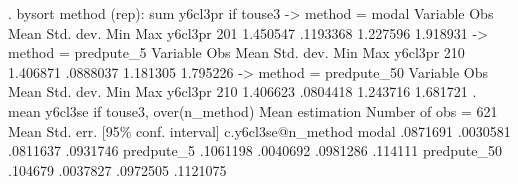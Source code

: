 . bysort method (rep): sum y6cl3pr if touse3
{\smallskip}
-> method = modal
{\smallskip}
    Variable {\VBAR}        Obs        Mean    Std. dev.       Min        Max
     y6cl3pr {\VBAR}        201    1.450547    .1193368   1.227596   1.918931
{\smallskip}
-> method = predpute_5
{\smallskip}
    Variable {\VBAR}        Obs        Mean    Std. dev.       Min        Max
     y6cl3pr {\VBAR}        210    1.406871    .0888037   1.181305   1.795226
{\smallskip}
-> method = predpute_50
{\smallskip}
    Variable {\VBAR}        Obs        Mean    Std. dev.       Min        Max
     y6cl3pr {\VBAR}        210    1.406623    .0804418   1.243716   1.681721
{\smallskip}
{\smallskip}
. mean y6cl3se if touse3, over(n_method)
{\smallskip}
Mean estimation                                  Number of obs = 621
{\smallskip}
                   {\VBAR}       Mean   Std. err.     [95\% conf. interval]
c.y6cl3se@n_method {\VBAR}
            modal  {\VBAR}   .0871691   .0030581      .0811637    .0931746
       predpute_5  {\VBAR}   .1061198   .0040692      .0981286     .114111
      predpute_50  {\VBAR}    .104679   .0037827      .0972505    .1121075
